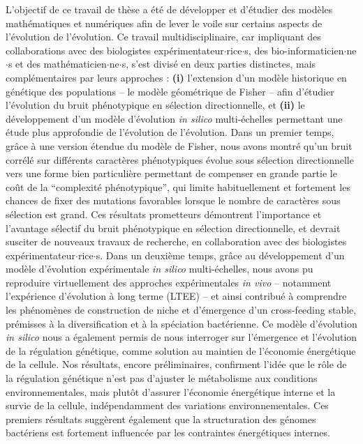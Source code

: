 L'objectif de ce travail de th\`ese a \'{e}t\'{e} de d\'{e}velopper et d'\'{e}tudier des mod\`eles math\'{e}matiques et num\'{e}riques afin de lever le voile sur certains aspects de l'\'{e}volution de l'\'{e}volution. Ce travail multidisciplinaire, car impliquant des collaborations avec des biologistes exp\'{e}rimentateur$\cdot$rice$\cdot$s, des bio-informaticien$\cdot$ne$\cdot$s et des math\'{e}maticien$\cdot$ne$\cdot$s, s'est divis\'{e} en deux parties distinctes, mais compl\'{e}mentaires par leurs approches : \textbf{(i)} l'extension d'un mod\`ele historique en g\'{e}n\'{e}tique des populations -- le mod\`ele g\'{e}om\'{e}trique de Fisher -- afin d'\'{e}tudier l'\'{e}volution du bruit ph\'{e}notypique en s\'{e}lection directionnelle, et \textbf{(ii)} le d\'{e}veloppement d'un mod\`ele d'\'{e}volution \textit{in silico} multi-\'{e}chelles permettant une \'{e}tude plus approfondie de l'\'{e}volution de l'\'{e}volution.
Dans un premier temps, gr\^{a}ce \`a une version \'{e}tendue du mod\`ele de Fisher, nous avons montr\'{e} qu'un bruit corr\'{e}l\'{e} sur diff\'{e}rents caract\`eres ph\'{e}notypiques \'{e}volue sous s\'{e}lection directionnelle vers une forme bien particuli\`ere permettant de compenser en grande partie le co\^{u}t de la ``complexit\'{e} ph\'{e}notypique'', qui limite habituellement et fortement les chances de fixer des mutations favorables lorsque le nombre de caract\`eres sous s\'{e}lection est grand. Ces r\'{e}sultats prometteurs d\'{e}montrent l'importance et l'avantage s\'{e}lectif du bruit ph\'{e}notypique en s\'{e}lection directionnelle, et devrait susciter de nouveaux travaux de recherche, en collaboration avec des biologistes exp\'{e}rimentateur$\cdot$rice$\cdot$s.
Dans un deuxi\`eme temps, gr\^{a}ce au d\'{e}veloppement d'un mod\`ele d'\'{e}volution exp\'{e}rimentale \textit{in silico} multi-\'{e}chelles, nous avons pu reproduire virtuellement des approches exp\'{e}rimentales \textit{in vivo} -- notamment l'exp\'{e}rience d'\'{e}volution \`a long terme (LTEE) -- et ainsi contribu\'{e} \`a comprendre les ph\'{e}nom\`enes de construction de niche et d'\'{e}mergence d'un cross-feeding stable, pr\'{e}misses \`a la diversification et \`a la sp\'{e}ciation bact\'{e}rienne.
Ce mod\`ele d'\'{e}volution \textit{in silico} nous a \'{e}galement permis de nous interroger sur l'\'{e}mergence et l'\'{e}volution de la r\'{e}gulation g\'{e}n\'{e}tique, comme solution au maintien de l'\'{e}conomie \'{e}nerg\'{e}tique de la cellule. Nos r\'{e}sultats, encore pr\'{e}liminaires, confirment l'id\'{e}e que le r\^{o}le de la r\'{e}gulation g\'{e}n\'{e}tique n'est pas d'ajuster le m\'{e}tabolisme aux conditions environnementales, mais plut\^ot d'assurer l'\'{e}conomie \'{e}nerg\'{e}tique interne et la survie de la cellule, ind\'{e}pendamment des variations environnementales. Ces premiers r\'{e}sultats sugg\`erent \'{e}galement que la structuration des g\'{e}nomes bact\'{e}riens est fortement influenc\'{e}e par les contraintes \'{e}nerg\'{e}tiques internes.

